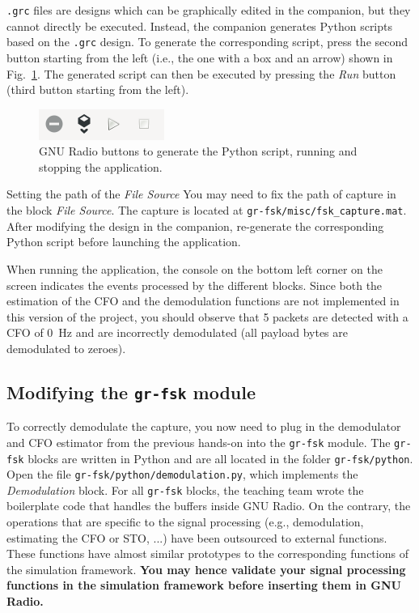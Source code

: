 \texttt{.grc} files are designs which can be graphically edited in the companion, but they cannot directly be executed.
Instead, the companion generates Python scripts based on the \texttt{.grc} design. To generate the corresponding script, press the second button starting from the left (i.e., the one with a box and an arrow) shown in Fig.~\ref{fig:buttons}.
The generated script can then be executed by pressing the \textit{Run} button (third button starting from the left).
\begin{figure}[H]
    \centering
    \includegraphics[scale=1]{figures/buttons.PNG}
    \caption{GNU Radio buttons to generate the Python script, running and stopping the application.}
    \label{fig:buttons}
\end{figure}

\begin{bclogo}[couleur = gray!20, arrondi = 0.2, logo=\bcinfo]{Setting the path of the \textit{File Source}}
    You may need to fix the path of capture in the block \textit{File Source}.
    The capture is located at \texttt{gr-fsk/misc/fsk\_capture.mat}.
    After modifying the design in the companion, re-generate the corresponding Python script before launching the application.
\end{bclogo}

When running the application, the console on the bottom left corner on the screen indicates the events processed by the different blocks.
Since both the estimation of the CFO and the demodulation functions are not implemented in this version of the project,
you should observe that 5 packets are detected with a CFO of \SI{0}{\hertz} and are incorrectly demodulated (all payload bytes are demodulated to zeroes).

\subsection{Modifying the \texttt{gr-fsk} module}

To correctly demodulate the capture, you now need to plug in the demodulator and CFO estimator from the previous hands-on into the \texttt{gr-fsk} module.
The \texttt{gr-fsk} blocks are written in Python and are all located in the folder \texttt{gr-fsk/python}.
Open the file \texttt{gr-fsk/python/demodulation.py}, which implements the \textit{Demodulation} block. For all \texttt{gr-fsk} blocks, the teaching team wrote the boilerplate code that
handles the buffers inside GNU Radio. On the contrary, the operations that are specific to the signal processing (e.g., demodulation, estimating the CFO or STO, ...) have been outsourced
to external functions. These functions have almost similar prototypes to the corresponding functions of the simulation framework.
\textbf{You may hence validate your signal processing functions in the simulation framework before inserting them in GNU Radio.}

